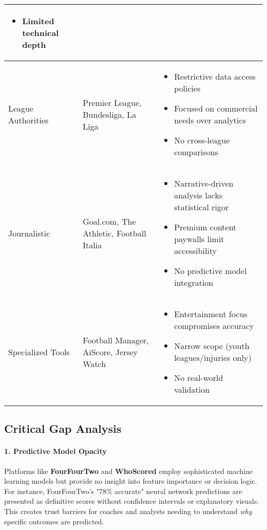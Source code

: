 \begin{table}[h!]
\begin{tabularx}{\textwidth}{|l|X|X|}
\begin{itemize}
            \item Limited technical depth
        \end{itemize} \\
        \hline
        League Authorities & Premier League, Bundesliga, La Liga & 
        \begin{itemize}
            \item Restrictive data access policies
            \item Focused on commercial needs over analytics
            \item No cross-league comparisons
        \end{itemize} \\
        \hline
        Journalistic & Goal.com, The Athletic, Football Italia & 
        \begin{itemize}
            \item Narrative-driven analysis lacks statistical rigor
            \item Premium content paywalls limit accessibility
            \item No predictive model integration
        \end{itemize} \\
        \hline
        Specialized Tools & Football Manager, AiScore, Jersey Watch & 
        \begin{itemize}
            \item Entertainment focus compromises accuracy
            \item Narrow scope (youth leagues/injuries only)
            \item No real-world validation
        \end{itemize} \\
        \hline
    \end{tabularx}
\end{table}

\subsection{Critical Gap Analysis}

\paragraph{1. Predictive Model Opacity}
Platforms like \textbf{FourFourTwo} and \textbf{WhoScored} employ sophisticated machine learning models but provide no insight into feature importance or decision logic. For instance, FourFourTwo's "78\% accurate" neural network predictions are presented as definitive scores without confidence intervals or explanatory visuals. This creates trust barriers for coaches and analysts needing to understand \textit{why} specific outcomes are predicted.

